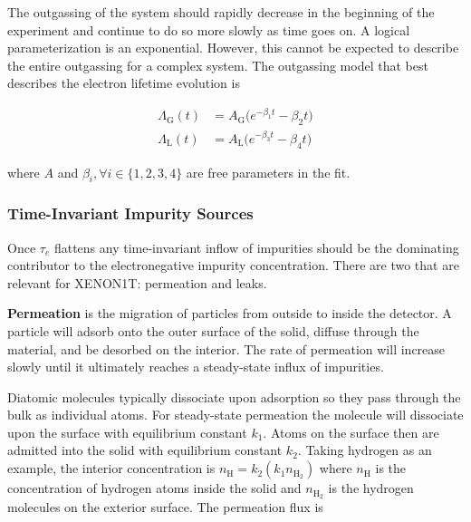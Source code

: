 The outgassing of the system should rapidly decrease in the beginning of the experiment and continue to do so more slowly as time goes
on.  A logical parameterization is an exponential.  However, this cannot be expected to describe the entire outgassing for a complex
system.  The outgassing model that best describes the electron lifetime evolution is

\vspace{-30pt}

\begin{subequations}
\begin{align}
\Lambda_{\mathrm{G}}(t) &= A_{\mathrm{G}} \big( e^{-\beta_1 t} - \beta_2 t \big) \\
\Lambda_{\mathrm{L}}(t) &= A_{\mathrm{L}} \big( e^{-\beta_3 t} - \beta_4 t \big)
\end{align}
\end{subequations}

\vspace{-10pt}

\noindent where $A$ and $\beta_i, \forall i \in \{1, 2, 3, 4\}$ are free parameters in the fit.



\subsubsection{Time-Invariant Impurity Sources}
\label{subsubsec:electron_lifetime_model_outgassing_leak_sources}
Once $\tau_e$ flattens any time-invariant inflow of impurities should be the dominating contributor to the electronegative impurity
concentration.  There are two that are relevant for XENON1T: permeation and leaks.

\textbf{Permeation} is the migration of particles from outside to inside the detector.  A particle will adsorb onto the outer surface of
the solid, diffuse through the material, and be desorbed on the interior.  The rate of permeation will increase slowly until it ultimately
reaches a steady-state influx of impurities.

Diatomic molecules typically dissociate
upon adsorption so they pass through the bulk as individual atoms.  For steady-state permeation the molecule will dissociate upon the
surface with equilibrium constant $k_1$.  Atoms on the surface then are admitted into the solid with equilibrium constant $k_2$.  Taking
hydrogen as an example, the
interior concentration is $n_{\mathrm{H}} = k_2 (k_1 n_{\mathrm{H_2}})$ where $n_{\mathrm{H}}$ is the concentration of hydrogen atoms
inside the solid and $n_{\mathrm{H_2}}$ is the hydrogen molecules on the exterior surface.  The permeation flux is

